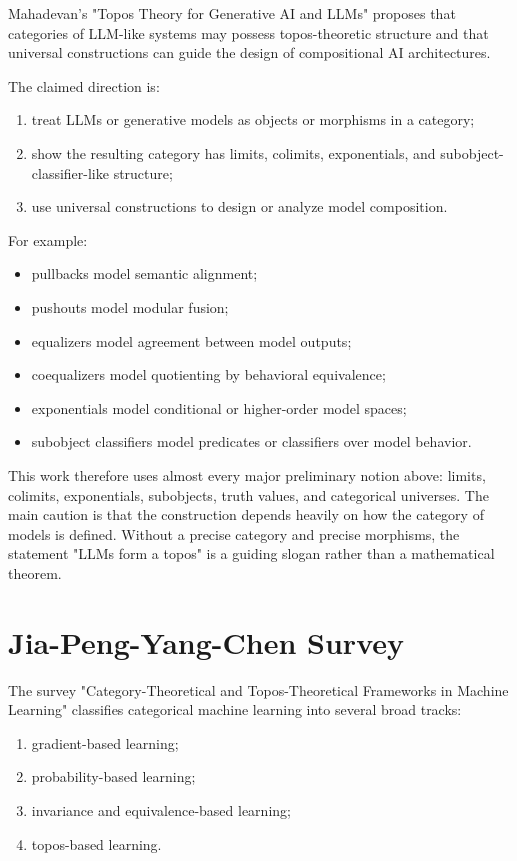 \documentclass[11pt]{article}
\begin{document}
Mahadevan's "Topos Theory for Generative AI and LLMs" proposes that categories of LLM-like systems may possess topos-theoretic structure and that universal constructions can guide the design of compositional AI architectures.


The claimed direction is:


\begin{enumerate}
\item treat LLMs or generative models as objects or morphisms in a category;
\item show the resulting category has limits, colimits, exponentials, and
subobject-classifier-like structure;

\item use universal constructions to design or analyze model composition.
\end{enumerate}

For example:


\begin{itemize}
\item pullbacks model semantic alignment;
\item pushouts model modular fusion;
\item equalizers model agreement between model outputs;
\item coequalizers model quotienting by behavioral equivalence;
\item exponentials model conditional or higher-order model spaces;
\item subobject classifiers model predicates or classifiers over model behavior.
\end{itemize}

This work therefore uses almost every major preliminary notion above: limits, colimits, exponentials, subobjects, truth values, and categorical universes. The main caution is that the construction depends heavily on how the category of models is defined. Without a precise category and precise morphisms, the statement "LLMs form a topos" is a guiding slogan rather than a mathematical theorem.


\section{Jia-Peng-Yang-Chen Survey}

The survey "Category-Theoretical and Topos-Theoretical Frameworks in Machine Learning" classifies categorical machine learning into several broad tracks:


\begin{enumerate}
\item gradient-based learning;
\item probability-based learning;
\item invariance and equivalence-based learning;
\item topos-based learning.
\end{enumerate}
\end{document}
